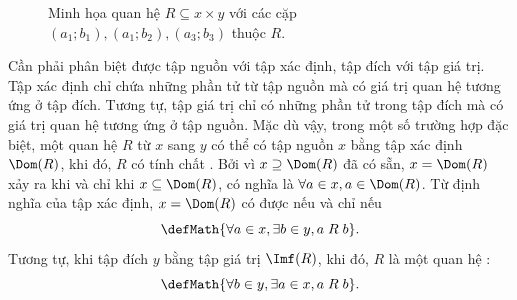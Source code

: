 \begin{figure}[H]
   \begin{center}
   \end{center}
   \caption{Minh họa quan hệ $R \subseteq x \times y$ với các cặp $(a_1; b_1), (a_1; b_2), (a_3; b_3)$ thuộc $R$.}
\end{figure}
Cần phải phân biệt được tập nguồn với tập xác định, tập đích với tập giá trị. Tập xác định chỉ chứa những phần tử từ tập nguồn mà có giá trị quan hệ tương ứng ở tập đích. Tương tự, tập giá trị chỉ có những phần tử trong tập đích mà có giá trị quan hệ tương ứng ở tập nguồn. Mặc dù vậy, trong một số trường hợp đặc biệt, một quan hệ $R$ từ $x$ sang $y$ có thể có tập nguồn $x$ bằng tập xác định $\Dom(R)$, khi đó, $R$ có tính chất . Bởi vì $x \supseteq \Dom(R)$ đã có sẵn, $x = \Dom(R)$ xảy ra khi và chỉ khi $x \subseteq \Dom(R)$, có nghĩa là $\forall a \in x, a \in \Dom(R)$. Từ định nghĩa của tập xác định, $x = \Dom(R)$ có được nếu và chỉ nếu
$$
   \defMath{\forall a \in x, \exists b \in y, a\;R\;b}.
$$
Tương tự, khi tập đích $y$ bằng tập giá trị $\Imf(R)$, khi đó, $R$ là một quan hệ :
$$
   \defMath{\forall b \in y, \exists a \in x, a\;R\;b}.
$$

